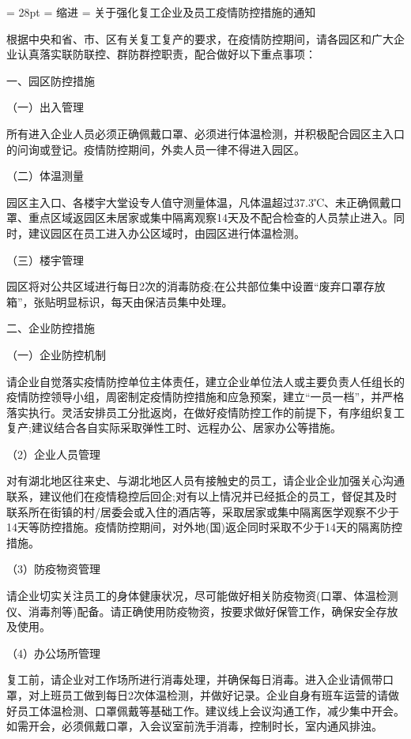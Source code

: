 {
\fangsong
\baselineskip = 28pt
 = \hbox{缩进}
\parindent = 
关于强化复工企业及员工疫情防控措施的通知\par
根据中央和省、市、区有关复工复产的要求，在疫情防控期间，请各园区和广大企业认真落实联防联控、群防群控职责，配合做好以下重点事项：\par
{\heiti 一、园区防控措施}\par
{\kaiti （一）出入管理}\par
所有进入企业人员必须正确佩戴口罩、必须进行体温检测，并积极配合园区主入口的问询或登记。疫情防控期间，外卖人员一律不得进入园区。\par
{\kaiti （二）体温测量}\par
园区主入口、各楼宇大堂设专人值守测量体温，凡体温超过37.3℃、未正确佩戴口罩、重点区域返园区未居家或集中隔离观察14天及不配合检查的人员禁止进入。同时，建议园区在员工进入办公区域时，由园区进行体温检测。\par
{\kaiti （三）楼宇管理}\par
园区将对公共区域进行每日2次的消毒防疫;在公共部位集中设置“废弃口罩存放箱”，张贴明显标识，每天由保洁员集中处理。\par
{\heiti 二、企业防控措施}\par
{\kaiti （一）企业防控机制}\par
请企业自觉落实疫情防控单位主体责任，建立企业单位法人或主要负责人任组长的疫情防控领导小组，周密制定疫情防控措施和应急预案，建立“一员一档”，并严格落实执行。灵活安排员工分批返岗，在做好疫情防控工作的前提下，有序组织复工复产;建议结合各自实际采取弹性工时、远程办公、居家办公等措施。\par
{\kaiti（2）企业人员管理}\par
对有湖北地区往来史、与湖北地区人员有接触史的员工，请企业企业加强关心沟通联系，建议他们在疫情稳控后回企;对有以上情况并已经抵企的员工，督促其及时联系所在街镇的村/居委会或入住的酒店等，采取居家或集中隔离医学观察不少于14天等防控措施。疫情防控期间，对外地(国)返企同时采取不少于14天的隔离防控措施。\par
{\kaiti（3）防疫物资管理}\par
请企业切实关注员工的身体健康状况，尽可能做好相关防疫物资(口罩、体温检测仪、消毒剂等)配备。请正确使用防疫物资，按要求做好保管工作，确保安全存放及使用。\par
{\kaiti（4）办公场所管理}\par
复工前，请企业对工作场所进行消毒处理，并确保每日消毒。进入企业请佩带口罩，对上班员工做到每日2次体温检测，并做好记录。企业自身有班车运营的请做好员工体温检测、口罩佩戴等基础工作。建议线上会议沟通工作，减少集中开会。如需开会，必须佩戴口罩，入会议室前洗手消毒，控制时长，室内通风排浊。\par
}
